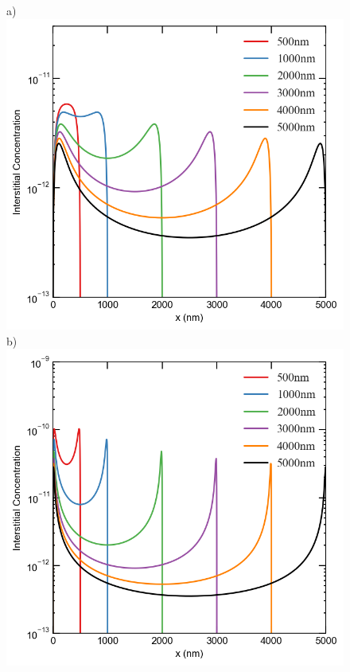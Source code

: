 \documentclass[utf8]{frontiersSCNS} %
\begin{document}
    \begin{figure}[h!]
        \centering
        a)\includegraphics[scale=0.55]{Fig5_a}
        b)\includegraphics[scale=0.55]{Fig5_b}

\end{figure}
\end{document}
